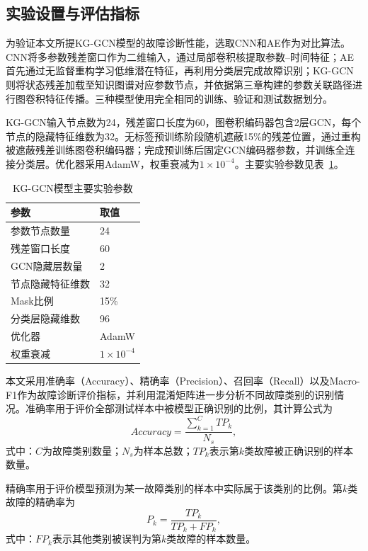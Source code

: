 \subsection{实验设置与评估指标}
\label{subsec:experiment_setting_yangstyle}

为验证本文所提KG-GCN模型的故障诊断性能，选取CNN和AE作为对比算法。CNN将多参数残差窗口作为二维输入，通过局部卷积核提取参数--时间特征；AE首先通过无监督重构学习低维潜在特征，再利用分类层完成故障识别；KG-GCN则将状态残差加载至知识图谱对应参数节点，并依据第三章构建的参数关联路径进行图卷积特征传播。三种模型使用完全相同的训练、验证和测试数据划分。

KG-GCN输入节点数为24，残差窗口长度为60，图卷积编码器包含2层GCN，每个节点的隐藏特征维数为32。无标签预训练阶段随机遮蔽15\%的残差位置，通过重构被遮蔽残差训练图卷积编码器；完成预训练后固定GCN编码器参数，并训练全连接分类层。优化器采用AdamW，权重衰减为$1\times10^{-4}$。主要实验参数见表~\ref{tab:kg_setting_yangstyle}。

\begin{table}[htbp]
    \centering
    \caption{KG-GCN模型主要实验参数}
    \label{tab:kg_setting_yangstyle}
    \begin{tabular}{ll}
        \toprule
        参数 & 取值 \\
        \midrule
        参数节点数量 & 24 \\
        残差窗口长度 & 60 \\
        GCN隐藏层数量 & 2 \\
        节点隐藏特征维数 & 32 \\
        Mask比例 & 15\% \\
        分类层隐藏维数 & 96 \\
        优化器 & AdamW \\
        权重衰减 & $1\times10^{-4}$ \\
        \bottomrule
    \end{tabular}
\end{table}

本文采用准确率（Accuracy）、精确率（Precision）、召回率（Recall）以及Macro-F1作为故障诊断评价指标，并利用混淆矩阵进一步分析不同故障类别的识别情况。准确率用于评价全部测试样本中被模型正确识别的比例，其计算公式为
\begin{equation}
Accuracy=\frac{\sum_{k=1}^{C}TP_k}{N_s},
\end{equation}
式中：$C$为故障类别数量；$N_s$为样本总数；$TP_k$表示第$k$类故障被正确识别的样本数量。

精确率用于评价模型预测为某一故障类别的样本中实际属于该类别的比例。第$k$类故障的精确率为
\begin{equation}
P_k=\frac{TP_k}{TP_k+FP_k},
\end{equation}
式中：$FP_k$表示其他类别被误判为第$k$类故障的样本数量。

